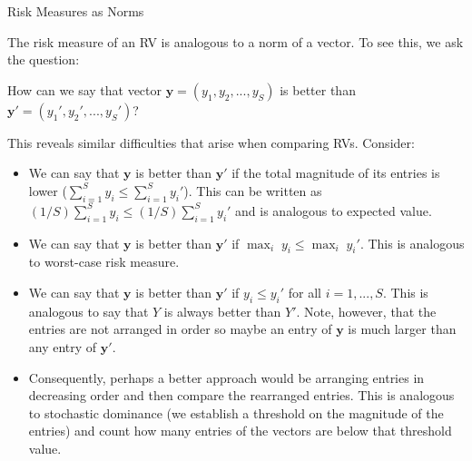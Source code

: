 \documentclass[9pt]{beamer}
\begin{document}
%
\begin{frame}{Risk Measures as Norms}

The risk measure of an RV is analogous to a norm of a vector. To see this, we ask the question:
\begin{block}{}
How can we say that vector $\mathbf{y}=(y_1,y_2,...,y_S)$ is better than $\mathbf{y}'=(y_1',y_2',...,y_S')$?
\end{block}
This reveals similar difficulties that arise when comparing RVs. Consider:
\begin{itemize}

\item We can say that $\mathbf{y} $ is better than $\mathbf{y}'$ if the total magnitude of its entries is lower ($\sum_{i=1}^Sy_i\leq \sum_{i=1}^Sy_i'$). This can be written as $(1/S)\sum_{i=1}^Sy_i\leq (1/S)\sum_{i=1}^Sy_i'$  and is analogous to expected value.

\item We can say that $\mathbf{y} $ is better than $\mathbf{y}'$ if $\max_i\; y_i\leq \max_i\; y_i'$. This is analogous to worst-case risk measure. 

\item  We can  say that $\mathbf{y}$ is better than $\mathbf{y}'$ if $y_i\leq y_i'$ for all $i=1,...,S$. This is analogous to say that $Y$ is always better than $Y'$.  Note, however, that the entries are not arranged in order so maybe an entry of $\mathbf{y}$ is much larger than any entry of $\mathbf{y}'$.  

\item Consequently, perhaps a better approach would be arranging entries in decreasing order and then compare the rearranged entries.  This is analogous to stochastic dominance (we establish a threshold on the magnitude of the entries) and count how many entries of the vectors are below that threshold value.  

\end{itemize}



\end{frame}
\end{document}
